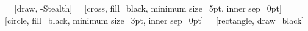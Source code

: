  = [draw, -Stealth]
 = [cross, fill=black, minimum size=5pt, inner sep=0pt]
 = [circle, fill=black, minimum size=3pt, inner sep=0pt]
 = [rectangle, draw=black]

\pgfplotsset{compat=1.18}

\renewcommand\thesubfigure{(\alph{subfigure})}
